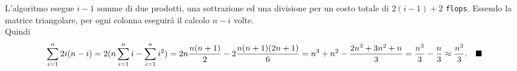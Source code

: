 L'algoritmo esegue $i-1$ somme di due prodotti, una sottrazione ed una divisione per un costo totale di $2(i-1)+2$ \texttt{flops}. Essendo la matrice triangolare, per ogni colonna eseguir\'a il calcolo $n-i$ volte.
\\
Quindi
\[
\sum_{i=1}^{n} 2i(n-i) = 2(n \sum_{i=1}^{n}i - \sum_{i=1}^{n} i^2) = 2n\frac{n(n+1)}{2} - 2\frac{n(n+1)(2n+1)}{6} = n^3 + n^2 - \frac{2n^3 + 3n^2 + n}{3} = \frac{n^3}{3} - \frac{n}{3} \approx \frac{n^3}{3}. \hspace{1em}\blacksquare
\]
